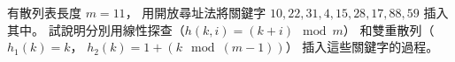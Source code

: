 \startEXERCISE
有散列表長度 $m=11$，
用開放尋址法將關鍵字
 $10,22,31,4,15,28,17,88,59$ 插入其中。
試說明分別用線性探查（$h(k,i)=(k+i)\mod m$）
和雙重散列（$h_1(k)=k$， $h_2(k)=1+(k\mod (m-1))$）
插入這些關鍵字的過程。
\stopEXERCISE

\startANSWER
\startcombination[2*1]
{\externalfigure[e11_4_1-1]}{}
{\externalfigure[e11_4_1-3]}{}
\stopcombination
\stopANSWER
